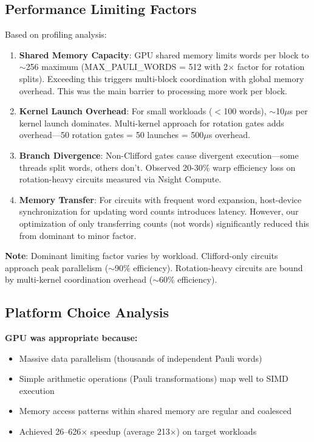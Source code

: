 \documentclass[11pt, a4paper]{article}
\begin{document}
\subsection{Performance Limiting Factors}

Based on profiling analysis:
\begin{enumerate}
    \item \textbf{Shared Memory Capacity}: GPU shared memory limits words per block to $\sim$256 maximum (MAX\_PAULI\_WORDS = 512 with 2$\times$ factor for rotation splits). Exceeding this triggers multi-block coordination with global memory overhead. This was the main barrier to processing more work per block.
    \item \textbf{Kernel Launch Overhead}: For small workloads ($<$100 words), $\sim$10$\mu$s per kernel launch dominates. Multi-kernel approach for rotation gates adds overhead---50 rotation gates = 50 launches = 500$\mu$s overhead.
    \item \textbf{Branch Divergence}: Non-Clifford gates cause divergent execution---some threads split words, others don't. Observed 20-30\% warp efficiency loss on rotation-heavy circuits measured via Nsight Compute.
    \item \textbf{Memory Transfer}: For circuits with frequent word expansion, host-device synchronization for updating word counts introduces latency. However, our optimization of only transferring counts (not words) significantly reduced this from dominant to minor factor.
\end{enumerate}

\noindent\textbf{Note}: Dominant limiting factor varies by workload. Clifford-only circuits approach peak parallelism ($\sim$90\% efficiency). Rotation-heavy circuits are bound by multi-kernel coordination overhead ($\sim$60\% efficiency).

\subsection{Platform Choice Analysis}

\textbf{GPU was appropriate because:}
\begin{itemize}
    \item Massive data parallelism (thousands of independent Pauli words)
    \item Simple arithmetic operations (Pauli transformations) map well to SIMD execution
    \item Memory access patterns within shared memory are regular and coalesced
    \item Achieved 26--626$\times$ speedup (average 213$\times$) on target workloads
\end{itemize}
\end{document}
